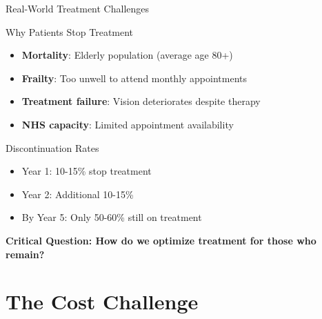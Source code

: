 \documentclass[10pt,aspectratio=169]{beamer}
\begin{document}
\begin{frame}{Real-World Treatment Challenges}
\begin{alertblock}{Why Patients Stop Treatment}
\begin{itemize}
    \item \textbf{Mortality}: Elderly population (average age 80+)
    \item \textbf{Frailty}: Too unwell to attend monthly appointments
    \item \textbf{Treatment failure}: Vision deteriorates despite therapy
    \item \textbf{NHS capacity}: Limited appointment availability
\end{itemize}
\end{alertblock}

\begin{block}{Discontinuation Rates}
\begin{itemize}
    \item Year 1: 10-15\% stop treatment
    \item Year 2: Additional 10-15\%
    \item By Year 5: Only 50-60\% still on treatment
\end{itemize}
\end{block}

\centering
\textbf{Critical Question: How do we optimize treatment for those who remain?}
\end{frame}

\section{The Cost Challenge}
\end{document}
